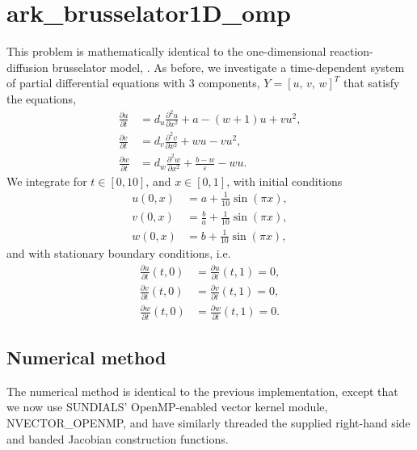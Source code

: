 \documentclass[letterpaper,10pt,english]{sphinxmanual}
\begin{document}
\section{ark\_brusselator1D\_omp}
\label{\detokenize{c_openmp:id1}}\label{\detokenize{c_openmp:ark-brusselator1d-omp}}
This problem is mathematically identical to the one-dimensional
reaction-diffusion brusselator model, {\hyperref[\detokenize{c_serial:ark-brusselator1d}]{}}.  As
before, we investigate a time-dependent system of partial differential
equations with 3 components, \(Y = [u,\, v,\, w]^T\) that satisfy
the equations,
\begin{equation*}
\begin{split}\frac{\partial u}{\partial t} &= d_u \frac{\partial^2 u}{\partial
   x^2} + a - (w+1) u + v u^2, \\
\frac{\partial v}{\partial t} &= d_v \frac{\partial^2 v}{\partial
   x^2} + w u - v u^2, \\
\frac{\partial w}{\partial t} &= d_w \frac{\partial^2 w}{\partial
   x^2} + \frac{b-w}{\varepsilon} - w u.\end{split}
\end{equation*}
We integrate for \(t \in [0, 10]\), and \(x \in [0, 1]\), with
initial conditions
\begin{equation*}
\begin{split}u(0,x) &=  a + \frac{1}{10} \sin(\pi x),\\
v(0,x) &= \frac{b}{a} + \frac{1}{10}\sin(\pi x),\\
w(0,x) &=  b + \frac{1}{10}\sin(\pi x),\end{split}
\end{equation*}
and with stationary boundary conditions, i.e.
\begin{equation*}
\begin{split}\frac{\partial u}{\partial t}(t,0) &= \frac{\partial u}{\partial t}(t,1) = 0,\\
\frac{\partial v}{\partial t}(t,0) &= \frac{\partial v}{\partial t}(t,1) = 0,\\
\frac{\partial w}{\partial t}(t,0) &= \frac{\partial w}{\partial t}(t,1) = 0.\end{split}
\end{equation*}

\subsection{Numerical method}
\label{\detokenize{c_openmp:numerical-method}}
The numerical method is identical to the previous implementation,
except that we now use SUNDIALS’ OpenMP-enabled vector kernel module,
NVECTOR\_OPENMP, and have similarly threaded the supplied right-hand
side and banded Jacobian construction functions.
\end{document}
